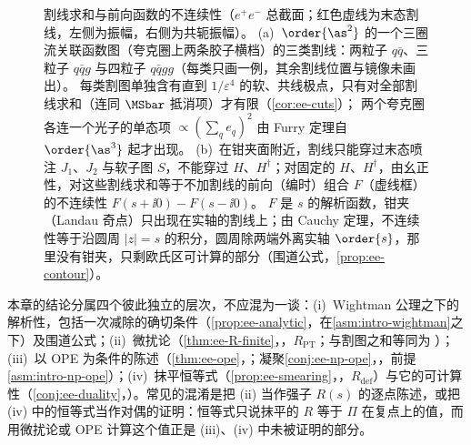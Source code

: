 \begin{figure}[htbp]
\caption{割线求和与前向函数的不连续性（$e^+e^-$ 总截面；红色虚线为末态割线，左侧为振幅，右侧为共轭振幅）。
(a)~$\order{\as^2}$ 的一个三圈流关联函数图（夸克圈上两条胶子横档）的三类割线：两粒子 $q\bar q$、三粒子 $q\bar qg$ 与四粒子 $q\bar qgg$（每类只画一例，其余割线位置与镜像未画出）。
每类割图单独含有直到 $1/\varepsilon^4$ 的软、共线极点，只有对全部割线求和（连同 $\MSbar$ 抵消项）才有限（\cref{cor:ee-cuts}）；
两个夸克圈各连一个光子的单态项 $\propto(\sum_qe_q)^2$ 由 Furry 定理自 $\order{\as^3}$ 起才出现。
(b)~在钳夹面附近，割线只能穿过末态喷注 $J_1$、$J_2$ 与软子图 $S$，不能穿过 $H$、$H^\dagger$；对固定的 $H$、$H^\dagger$，由幺正性，对这些割线求和等于不加割线的前向（编时）组合 $F$（虚线框）的不连续性 $F(s+\ii0)-F(s-\ii0)$。
$F$ 是 $s$ 的解析函数，钳夹（Landau 奇点）只出现在实轴的割线上；由 Cauchy 定理，不连续性等于沿圆周 $|z|=s$ 的积分，圆周除两端外离实轴 $\order{s}$，那里没有钳夹，只剩欧氏区可计算的部分（围道公式，\cref{prop:ee-contour}）。}
\label{fig:ee-cutsum-disc}
\end{figure}

\begin{remark}[四个逻辑层次]\label{rem:ee-status-layout}
本章的结论分属四个彼此独立的层次，不应混为一谈：(i)~Wightman 公理之下的解析性，包括一次减除的确切条件（\cref{prop:ee-analytic}，在\cref{asm:intro-wightman}之下）及围道公式；(ii)~微扰论（\cref{thm:ee-R-finite}，\tagR，$R_{\mathrm{PT}}$；与割图之和等同为 \tagA）；(iii)~以 OPE 为条件的陈述（\cref{thm:ee-ope}，\tagA；凝聚\cref{conj:ee-np-ope}，\tagC，前提\cref{asm:intro-np-ope}）；(iv)~抹平恒等式（\cref{prop:ee-smearing}，\tagR，$R_{\mathrm{def}}$）与它的可计算性（\cref{conj:ee-duality}，\tagC）。常见的混淆是把 (ii) 当作强子 $R(s)$ 的逐点陈述，或把 (iv) 中的恒等式当作对偶的证明：恒等式只说抹平的 $R$ 等于 $\Pi$ 在复点上的值，而用微扰论或 OPE 计算这个值正是 (iii)、(iv) 中未被证明的部分。
\end{remark}

